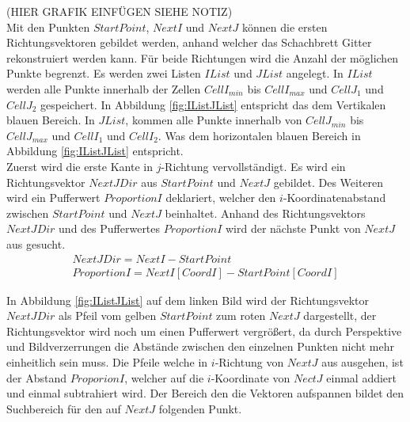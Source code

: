 (HIER GRAFIK EINFÜGEN SIEHE NOTIZ)\\


Mit den Punkten $StartPoint$, $NextI$ und $NextJ$ können die ersten Richtungsvektoren gebildet werden, anhand welcher das Schachbrett Gitter rekonstruiert werden kann. Für beide Richtungen wird die Anzahl der möglichen Punkte begrenzt. Es werden zwei Listen $IList$ und $JList$ angelegt. In $IList$ werden alle Punkte innerhalb der Zellen $CellI_{min}$ bis $CellI_{max}$ und $CellJ_1$ und $CellJ_2$ gespeichert. In Abbildung \ref{fig:IListJList} entspricht das dem Vertikalen blauen Bereich. In $JList$, kommen alle Punkte innerhalb von $CellJ_{min}$ bis $CellJ_{max}$ und $CellI_1$ und $CellI_2$. Was dem horizontalen blauen Bereich in Abbildung \ref{fig:IListJList} entspricht. \\

Zuerst wird die erste Kante in $j$-Richtung vervollständigt. Es wird ein Richtungsvektor $NextJDir$ aus $StartPoint$ und $NextJ$ gebildet. Des Weiteren wird ein Pufferwert $ProportionI$ deklariert, welcher den $i$-Koordinatenabstand zwischen $StartPoint$ und $NextJ$ beinhaltet. Anhand des Richtungsvektors $NextJDir$ und des Pufferwertes $ProportionI$ wird der nächste Punkt von $NextJ$ aus gesucht. \\

\begin{gather*}
	NextJDir = NextI - StartPoint\\
	ProportionI = NextI[CoordI]-StartPoint[CoordI]
\end{gather*}

In Abbildung \ref{fig:IListJList} auf dem linken Bild wird der Richtungsvektor $NextJDir$ als Pfeil vom gelben $StartPoint$ zum roten $NextJ$ dargestellt, der Richtungsvektor wird noch um einen Pufferwert vergrößert, da durch Perspektive und Bildverzerrungen die Abstände zwischen den einzelnen Punkten nicht mehr einheitlich sein muss. Die Pfeile welche in $i$-Richtung von $NextJ$ aus ausgehen, ist der Abstand $ProporionI$, welcher auf die $i$-Koordinate von $NectJ$ einmal addiert und einmal subtrahiert wird. Der Bereich den die Vektoren aufspannen bildet den Suchbereich für den auf $NextJ$ folgenden Punkt.\\


